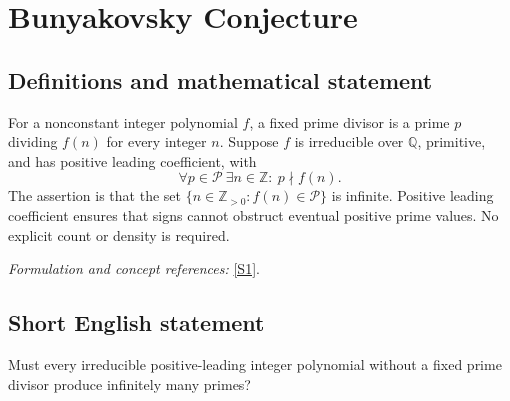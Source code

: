 \documentclass[11pt]{article}
\newcommand{\Z}{\mathbb{Z}}
\newcommand{\Q}{\mathbb{Q}}
\newcommand{\sref}[2]{\hyperlink{source:#1:#2}{[S#2]}}
\newif\ifshowcatalogue
\newcommand{\cataloguescope}[1]{\ifshowcatalogue
 \paragraph{Exact scope in the supplied catalogue.}
 \begin{quote}\small #1\end{quote}\fi}
\begin{document}
\setcounter{section}{0}
\clearpage
\section*{\texorpdfstring{Bunyakovsky Conjecture}{Bunyakovsky Conjecture}}\label{statement}
\subsection{Definitions and mathematical statement}
For a nonconstant integer polynomial $f$, a fixed prime divisor is a prime $p$ dividing $f(n)$ for every integer $n$. Suppose $f$ is irreducible over $\Q$, primitive, and has positive leading coefficient, with
\[
 \forall p\in\mathcal P\ \exists n\in\Z:\ p\nmid f(n).
\]
The assertion is that the set $\{n\in\Z_{>0}:f(n)\in\mathcal P\}$ is infinite. Positive leading coefficient ensures that signs cannot obstruct eventual positive prime values. No explicit count or density is required.
\par\smallskip\textit{Formulation and concept references:} \sref{statement}{1}.
\cataloguescope{Prove or disprove that every irreducible polynomial f in Z[x] with positive leading coefficient and no fixed prime divisor takes prime values for infinitely many positive integer inputs.}
\subsection{Short English statement}
Must every irreducible positive-leading integer polynomial without a fixed prime divisor produce infinitely many primes?
\end{document}
